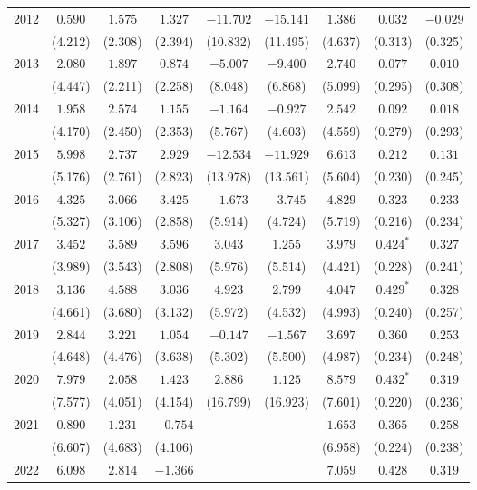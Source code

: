 \begin{table}[htbp]
{\begin{tabular}{lcccccccc}
2012 & $0.590$ & $1.575$ & $1.327$ & $-11.702$ & $-15.141$ & $1.386$ & $0.032$ & $-0.029$ \\
 & (4.212) & (2.308) & (2.394) & (10.832) & (11.495) & (4.637) & (0.313) & (0.325) \\
2013 & $2.080$ & $1.897$ & $0.874$ & $-5.007$ & $-9.400$ & $2.740$ & $0.077$ & $0.010$ \\
 & (4.447) & (2.211) & (2.258) & (8.048) & (6.868) & (5.099) & (0.295) & (0.308) \\
2014 & $1.958$ & $2.574$ & $1.155$ & $-1.164$ & $-0.927$ & $2.542$ & $0.092$ & $0.018$ \\
 & (4.170) & (2.450) & (2.353) & (5.767) & (4.603) & (4.559) & (0.279) & (0.293) \\
2015 & $5.998$ & $2.737$ & $2.929$ & $-12.534$ & $-11.929$ & $6.613$ & $0.212$ & $0.131$ \\
 & (5.176) & (2.761) & (2.823) & (13.978) & (13.561) & (5.604) & (0.230) & (0.245) \\
2016 & $4.325$ & $3.066$ & $3.425$ & $-1.673$ & $-3.745$ & $4.829$ & $0.323$ & $0.233$ \\
 & (5.327) & (3.106) & (2.858) & (5.914) & (4.724) & (5.719) & (0.216) & (0.234) \\
2017 & $3.452$ & $3.589$ & $3.596$ & $3.043$ & $1.255$ & $3.979$ & $0.424^{*}$ & $0.327$ \\
 & (3.989) & (3.543) & (2.808) & (5.976) & (5.514) & (4.421) & (0.228) & (0.241) \\
2018 & $3.136$ & $4.588$ & $3.036$ & $4.923$ & $2.799$ & $4.047$ & $0.429^{*}$ & $0.328$ \\
 & (4.661) & (3.680) & (3.132) & (5.972) & (4.532) & (4.993) & (0.240) & (0.257) \\
2019 & $2.844$ & $3.221$ & $1.054$ & $-0.147$ & $-1.567$ & $3.697$ & $0.360$ & $0.253$ \\
 & (4.648) & (4.476) & (3.638) & (5.302) & (5.500) & (4.987) & (0.234) & (0.248) \\
2020 & $7.979$ & $2.058$ & $1.423$ & $2.886$ & $1.125$ & $8.579$ & $0.432^{*}$ & $0.319$ \\
 & (7.577) & (4.051) & (4.154) & (16.799) & (16.923) & (7.601) & (0.220) & (0.236) \\
2021 & $0.890$ & $1.231$ & $-0.754$ &  &  & $1.653$ & $0.365$ & $0.258$ \\
 & (6.607) & (4.683) & (4.106) &  &  & (6.958) & (0.224) & (0.238) \\
2022 & $6.098$ & $2.814$ & $-1.366$ &  &  & $7.059$ & $0.428$ & $0.319$ \\

\end{tabular}}
\end{table}

